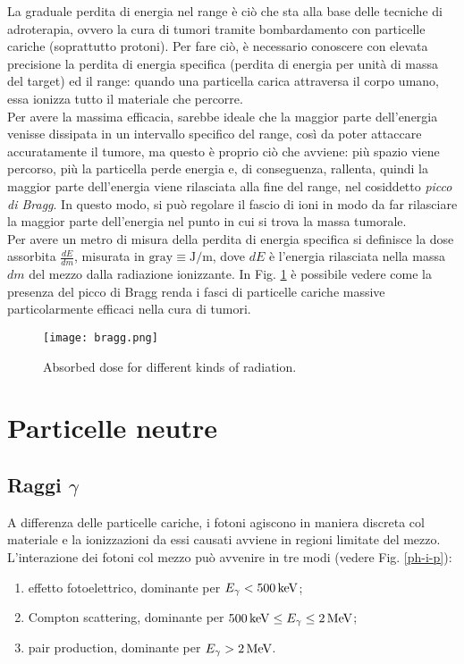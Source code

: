 La graduale perdita di energia nel range è ciò che sta alla base delle tecniche di adroterapia, ovvero la cura di tumori tramite bombardamento con particelle cariche (soprattutto protoni). Per fare ciò, è necessario conoscere con elevata precisione la perdita di energia specifica (perdita di energia per unità di massa del target) ed il range: quando una particella carica attraversa il corpo umano, essa ionizza tutto il materiale che percorre.\\
Per avere la massima efficacia, sarebbe ideale che la maggior parte dell'energia venisse dissipata in un intervallo specifico del range, così da poter attaccare accuratamente il tumore, ma questo è proprio ciò che avviene: più spazio viene percorso, più la particella perde energia e, di conseguenza, rallenta, quindi la maggior parte dell'energia viene rilasciata alla fine del range, nel cosiddetto \textit{picco di Bragg}. In questo modo, si può regolare il fascio di ioni in modo da far rilasciare la maggior parte dell'energia nel punto in cui si trova la massa tumorale.\\
Per avere un metro di misura della perdita di energia specifica si definisce la dose assorbita $ \frac{dE}{dm} $, misurata in $ \text{gray} \equiv \text{J} / \text{m} $, dove $ dE $ è l'energia rilasciata nella massa $ dm $ del mezzo dalla radiazione ionizzante. In Fig. \ref{bragg} è possibile vedere come la presenza del picco di Bragg renda i fasci di particelle cariche massive particolarmente efficaci nella cura di tumori.

\begin{figure}[!t]
	\centering
	\texttt{[image: bragg.png]}
	\caption{Absorbed dose for different kinds of radiation.}
	\label{bragg}
\end{figure}

\section{Particelle neutre}

\subsection{Raggi \texorpdfstring{$ \gamma $}{TEXT}}

A differenza delle particelle cariche, i fotoni agiscono in maniera discreta col materiale e la ionizzazioni da essi causati avviene in regioni limitate del mezzo.\\
L'interazione dei fotoni col mezzo può avvenire in tre modi (vedere Fig. \ref{ph-i-p}):
\begin{enumerate}
	\item effetto fotoelettrico, dominante per $ E_{\gamma} < 500 \,\mathrm{keV} $;
	\item Compton scattering, dominante per $ 500 \,\mathrm{keV} \le E_{\gamma} \le 2 \,\mathrm{MeV} $;
	\item pair production, dominante per $ E_{\gamma} > 2 \,\mathrm{MeV} $.
\end{enumerate}

